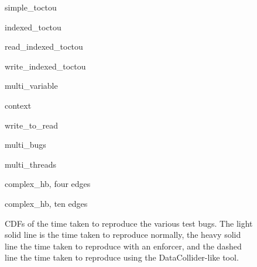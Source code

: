\begin{figure}
  \begin{minipage}{52mm}
    
    \vspace{-7mm}simple\_toctou
  \end{minipage}
  \begin{minipage}{52mm}
    
    \vspace{-7mm}indexed\_toctou
  \end{minipage}
  \begin{minipage}{52mm}
    
    \vspace{-7mm}read\_indexed\_toctou
  \end{minipage}
  \begin{minipage}{52mm}
    
    \vspace{-7mm}write\_indexed\_toctou
  \end{minipage}
  \begin{minipage}{52mm}
    
    \vspace{-7mm}multi\_variable
  \end{minipage}
  \begin{minipage}{52mm}
    
    \vspace{-7mm}context
  \end{minipage}
  \begin{minipage}{52mm}
    
    \vspace{-7mm}write\_to\_read
  \end{minipage}
  \begin{minipage}{52mm}
    
    \vspace{-7mm}multi\_bugs
  \end{minipage}
  \begin{minipage}{52mm}
    
    \vspace{-7mm}multi\_threads
  \end{minipage}
  \begin{minipage}{52mm}
    
    \vspace{-7mm}complex\_hb, four edges
  \end{minipage}
  \begin{minipage}{52mm}
    
    \vspace{-7mm}complex\_hb, ten edges
  \end{minipage}
  \begin{minipage}{52mm}
    \caption{CDFs of the time taken to reproduce the various test bugs.  The light solid line is the time taken to reproduce normally, the heavy solid line the time taken to reproduce with an enforcer, and the dashed line the time taken to reproduce using the DataCollider-like tool.}
    \label{fig:eval:artificial:crash_times_cdfs}
  \end{minipage}
\end{figure}
